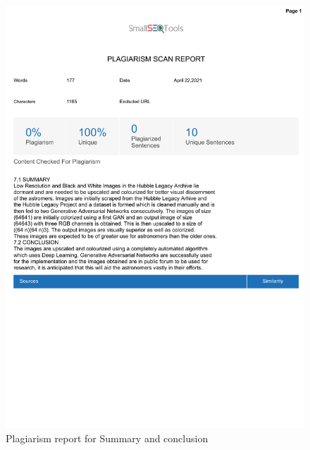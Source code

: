 \documentclass[oneside,a4paper,12pt]{report}
\begin{document}
\begin{appendices}
\begin{figure}
	\centering
    \includegraphics[width=\textwidth, height=\textheight]{plagiarism/summary_conclusion.pdf}
    \caption{Plagiarism report for Summary and conclusion}
    \label{PlagiarismSummary}
\end{figure}


\end{appendices}
\end{document}
